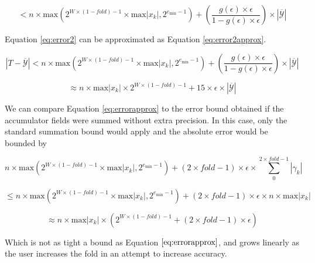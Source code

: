 \documentclass[12pt]{article}
\providecommand{\min}{\ensuremath{\text{min}}}
\providecommand{\max}{\ensuremath{\text{max}}}
\theoremstyle{definition}
\numberwithin{equation}{section}
\begin{document}
    \begin{equation}
      < n \times \max(2^{W \times (1 - fold) - 1} \times \max|x_k|, 2^{e_{\min} - 1}) + (\frac{g(\epsilon)\times\epsilon}{1 - g(\epsilon)\times\epsilon}) \times |\overline{\mathcal{Y}}|
      \label{eq:error2}
    \end{equation}

    Equation \ref{eq:error2} can be approximated as Equation \ref{eq:error2approx}.

    \begin{equation*}
      |T - \overline{\mathcal{Y}}| < n \times \max(2^{W \times (1 - fold) - 1} \times \max|x_k|, 2^{e_{\min} - 1}) + (\frac{g(\epsilon)\times\epsilon}{1 - g(\epsilon)\times\epsilon}) \times |\overline{\mathcal{Y}}|
    \end{equation*}

    \begin{equation}
      \approx n \times \max|x_k|\times 2^{W \times (1 - fold) - 1} + 15 \times \epsilon \times |\overline{\mathcal{Y}}|
      \label{eq:error2approx}
    \end{equation}

    We can compare Equation \ref{eq:errorapprox} to the error bound obtained if the accumulator fields were summed without extra precision. In this case, only the standard summation bound would apply and the absolute error would be bounded by

    \begin{equation*}
    n \times \max(2^{W \times (1 - fold) - 1} \times \max|x_k|, 2^{e_{\min} - 1}) + (2 \times fold - 1) \times \epsilon \times \sum\limits_0^{2 \times fold - 1}|\gamma_k|
    \end{equation*}

    \begin{equation*}
    \leq n \times \max(2^{W \times (1 - fold) - 1} \times \max|x_k|, 2^{e_{\min} - 1}) + (2 \times fold - 1) \times \epsilon \times n \times \max|x_k|
    \end{equation*}

    \begin{equation}
    \approx n \times \max|x_k|\times (2^{W \times (1 - fold) - 1} + (2 \times fold - 1) \times \epsilon)
    \label{eq:baderrorapprox}
    \end{equation}

    Which is not as tight a bound as Equation $\ref{eq:errorapprox}$, and grows linearly as the user increases the fold in an attempt to increase accuracy.
\end{document}
